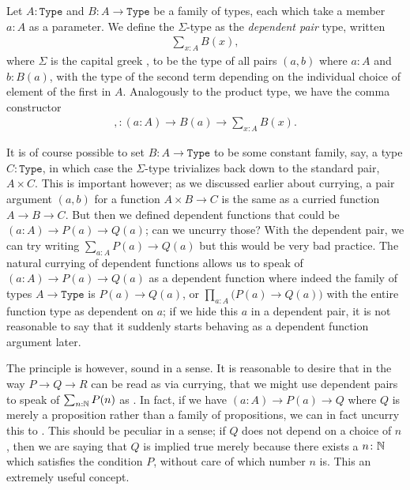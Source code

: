 \documentclass[11pt]{article}
\begin{document}
\begin{definition}
Let $A \colon \mathtt{Type}$ and $B \colon A \to \mathtt{Type}$ be a family of types, each which take a member $a \colon A$ as a parameter. We define the $\Sigma$-type as the \emph{dependent pair} type, written \begin{gather*}
\sum_{x : A} B(x),
\end{gather*}
where $\Sigma$ is the capital greek , to be the type of all pairs $(a,b)$ where $a\colon A$ and $b \colon B(a)$, with the type of the second term depending on the individual choice of element of the first in $A$. Analogously to the product type, we have the comma constructor \begin{gather*}
, \colon (a \colon A) \to B(a) \to \sum_{x : A} B(x).
\end{gather*}
\end{definition}

It is of course possible to set $B \colon A \to \mathtt{Type}$ to be some constant family, say, a type $C \colon \mathtt{Type}$, in which case the $\Sigma$-type trivializes back down to the standard pair, $A \times C$. This is important however; as we discussed earlier about currying, a pair argument $(a,b)$ for a function $A \times B \to C$ is the same as a curried function $A \to B \to C$. But then we defined dependent functions that could be $(a \colon A) \to P(a) \to Q(a)$; can we uncurry those? With the dependent pair, we can try writing $\sum_{a : A} P(a) \to Q(a)$ but this would be very bad practice. The natural currying of dependent functions allows us to speak of $(a \colon A) \to P(a) \to Q(a)$ as a dependent function where indeed the family of types $A \to \mathtt{Type}$ is $P(a) \to Q(a)$, or $\prod_{a : A} \big(P(a) \to Q(a)\big)$ with the entire function type as dependent on $a$; if we hide this $a$ in a dependent pair, it is not reasonable to say that it suddenly starts behaving as a dependent function argument later.

The principle is however, sound in a sense. It is reasonable to desire that in the way $P \to Q \to R$ can be read as  via currying, that we might use dependent pairs to speak of $\sum_{n : \mathbb{N}} P(n)$ as . In fact, if we have $(a \colon A) \to P(a) \to Q$ where $Q$ is merely a proposition rather than a family of propositions, we can in fact uncurry this to . This should be peculiar in a sense; if $Q$ does not depend on a choice of $n$, then we are saying that $Q$ is implied true merely because there exists a $n \colon \mathbb{N}$ which satisfies the condition $P$, without care of which number $n$ is. This an extremely useful concept.
\end{document}
